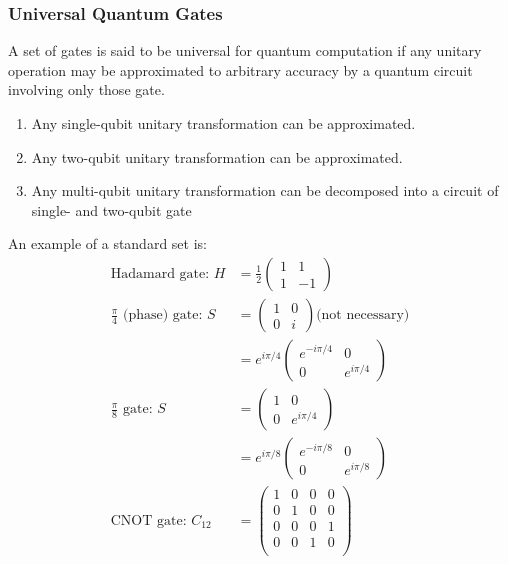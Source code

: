 \subsubsection{Universal Quantum Gates}
A set of gates is said to be universal for quantum computation if any unitary operation may be approximated to arbitrary accuracy by a quantum circuit involving only those gate. 
\begin{enumerate}
    \item\small Any single-qubit unitary transformation can be approximated. 
    \item\small Any two-qubit unitary transformation can be approximated. 
    \item\small Any multi-qubit unitary transformation can be decomposed into a circuit of single- and two-qubit gate
\end{enumerate}

An example of a standard set is:
\begin{align*}
    \text{Hadamard gate: } H&=\frac{1}{2}\begin{pmatrix}
        1 & 1 \\ 1 & -1
    \end{pmatrix}\\
    \frac{\pi}{4}\text{ (phase) gate: } S&=\begin{pmatrix}
        1 &0\\0&i
    \end{pmatrix}\text{(not necessary)}\\
    &=e^{i\pi/4}\begin{pmatrix}
        e^{-i\pi/4} & 0 \\ 0 & e^{i\pi/4}
    \end{pmatrix}\\
    \frac{\pi}{8}\text{ gate: } S&=\begin{pmatrix}
        1 &0\\0&e^{i\pi/4}
    \end{pmatrix}\\
    &=e^{i\pi/8}\begin{pmatrix}
        e^{-i\pi/8} & 0 \\ 0 & e^{i\pi/8}
    \end{pmatrix}\\
    \text{CNOT gate: } C_{12}&=\begin{pmatrix}
        1 & 0& 0&0\\
        0 & 1& 0&0\\
        0 & 0& 0&1\\
        0 & 0& 1&0\\
    \end{pmatrix}
\end{align*}

